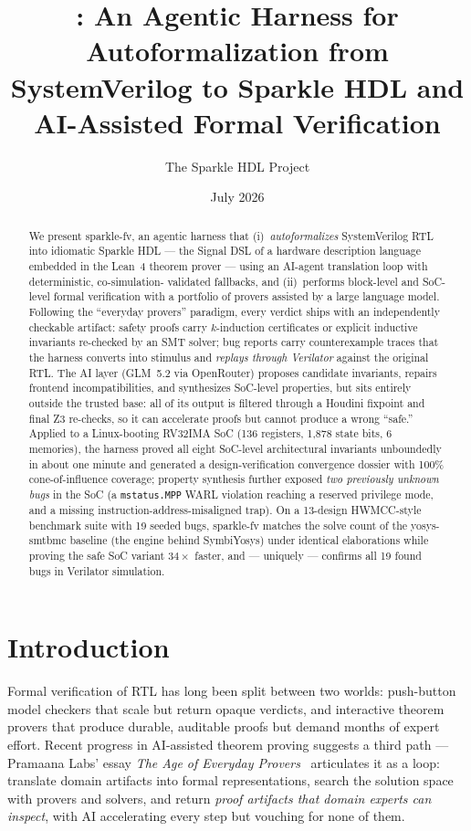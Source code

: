 \documentclass[11pt]{article}
\title{\sfv{}: An Agentic Harness for Autoformalization from
SystemVerilog to Sparkle HDL and AI-Assisted Formal Verification}
\author{The Sparkle HDL Project}
\date{July 2026}
\newcommand{\sfv}{\textsf{sparkle-fv}}
\newcommand{\tool}[1]{\textsf{#1}}
\begin{document}
\maketitle

\begin{abstract}
We present \sfv{}, an agentic harness that (i)~\emph{autoformalizes}
SystemVerilog RTL into idiomatic Sparkle HDL --- the Signal DSL of a
hardware description language embedded in the Lean~4 theorem prover ---
using an AI-agent translation loop with deterministic, co-simulation-
validated fallbacks, and (ii)~performs block-level and SoC-level formal
verification with a portfolio of provers assisted by a large language
model. Following the ``everyday provers'' paradigm, every
verdict ships with an independently checkable artifact: safety proofs carry
$k$-induction certificates or explicit inductive invariants re-checked by an
SMT solver; bug reports carry counterexample traces that the harness
converts into stimulus and \emph{replays through Verilator} against the
original RTL. The AI layer (GLM~5.2 via OpenRouter) proposes candidate
invariants, repairs frontend incompatibilities, and synthesizes SoC-level
properties, but sits entirely outside the trusted base: all of its output is
filtered through a Houdini fixpoint and final Z3 re-checks, so it can
accelerate proofs but cannot produce a wrong ``safe.'' Applied to a
Linux-booting RV32IMA SoC (136 registers, 1{,}878 state bits, 6 memories),
the harness proved all eight SoC-level architectural invariants unboundedly
in about one minute and generated a design-verification convergence dossier
with 100\% cone-of-influence coverage; property synthesis further exposed
\emph{two previously unknown bugs} in the SoC (a \texttt{mstatus.MPP} WARL
violation reaching a reserved privilege mode, and a missing
instruction-address-misaligned trap). On a 13-design HWMCC-style benchmark
suite with 19 seeded bugs, \sfv{} matches the solve count of the
\tool{yosys-smtbmc} baseline (the engine behind SymbiYosys) under identical
elaborations while proving the safe SoC variant $34\times$ faster, and ---
uniquely --- confirms all 19 found bugs in Verilator simulation.
\end{abstract}

\section{Introduction}

Formal verification of RTL has long been split between two worlds:
push-button model checkers that scale but return opaque verdicts, and
interactive theorem provers that produce durable, auditable proofs but
demand months of expert effort. Recent progress in AI-assisted theorem
proving suggests a third path --- Pramaana Labs' essay \emph{The Age of
Everyday Provers}~\cite{pramaana} articulates it as a loop: translate domain
artifacts into formal representations, search the solution space with
provers and solvers, and return \emph{proof artifacts that domain experts
can inspect}, with AI accelerating every step but vouching for none of them.
\end{document}

